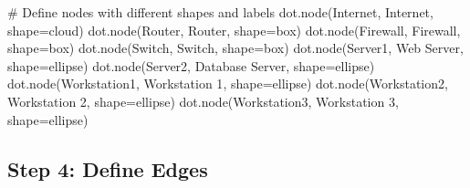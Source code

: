 \documentclass[
  letterpaper,
  DIV=11,
  numbers=noendperiod]{scrreprt}
\newenvironment{Shaded}{\begin{snugshade}}{\end{snugshade}}
\newcommand{\CommentTok}[1]{\textcolor[rgb]{0.37,0.37,0.37}{#1}}
\newcommand{\NormalTok}[1]{\textcolor[rgb]{0.00,0.23,0.31}{#1}}
\newcommand{\OperatorTok}[1]{\textcolor[rgb]{0.37,0.37,0.37}{#1}}
\newcommand{\StringTok}[1]{\textcolor[rgb]{0.13,0.47,0.30}{#1}}
\begin{document}
\begin{Shaded}
\begin{Highlighting}[]
\CommentTok{\# Define nodes with different shapes and labels}
\NormalTok{dot.node(}\StringTok{\textquotesingle{}Internet\textquotesingle{}}\NormalTok{, }\StringTok{\textquotesingle{}Internet\textquotesingle{}}\NormalTok{, shape}\OperatorTok{=}\StringTok{\textquotesingle{}cloud\textquotesingle{}}\NormalTok{)}
\NormalTok{dot.node(}\StringTok{\textquotesingle{}Router\textquotesingle{}}\NormalTok{, }\StringTok{\textquotesingle{}Router\textquotesingle{}}\NormalTok{, shape}\OperatorTok{=}\StringTok{\textquotesingle{}box\textquotesingle{}}\NormalTok{)}
\NormalTok{dot.node(}\StringTok{\textquotesingle{}Firewall\textquotesingle{}}\NormalTok{, }\StringTok{\textquotesingle{}Firewall\textquotesingle{}}\NormalTok{, shape}\OperatorTok{=}\StringTok{\textquotesingle{}box\textquotesingle{}}\NormalTok{)}
\NormalTok{dot.node(}\StringTok{\textquotesingle{}Switch\textquotesingle{}}\NormalTok{, }\StringTok{\textquotesingle{}Switch\textquotesingle{}}\NormalTok{, shape}\OperatorTok{=}\StringTok{\textquotesingle{}box\textquotesingle{}}\NormalTok{)}
\NormalTok{dot.node(}\StringTok{\textquotesingle{}Server1\textquotesingle{}}\NormalTok{, }\StringTok{\textquotesingle{}Web Server\textquotesingle{}}\NormalTok{, shape}\OperatorTok{=}\StringTok{\textquotesingle{}ellipse\textquotesingle{}}\NormalTok{)}
\NormalTok{dot.node(}\StringTok{\textquotesingle{}Server2\textquotesingle{}}\NormalTok{, }\StringTok{\textquotesingle{}Database Server\textquotesingle{}}\NormalTok{, shape}\OperatorTok{=}\StringTok{\textquotesingle{}ellipse\textquotesingle{}}\NormalTok{)}
\NormalTok{dot.node(}\StringTok{\textquotesingle{}Workstation1\textquotesingle{}}\NormalTok{, }\StringTok{\textquotesingle{}Workstation 1\textquotesingle{}}\NormalTok{, shape}\OperatorTok{=}\StringTok{\textquotesingle{}ellipse\textquotesingle{}}\NormalTok{)}
\NormalTok{dot.node(}\StringTok{\textquotesingle{}Workstation2\textquotesingle{}}\NormalTok{, }\StringTok{\textquotesingle{}Workstation 2\textquotesingle{}}\NormalTok{, shape}\OperatorTok{=}\StringTok{\textquotesingle{}ellipse\textquotesingle{}}\NormalTok{)}
\NormalTok{dot.node(}\StringTok{\textquotesingle{}Workstation3\textquotesingle{}}\NormalTok{, }\StringTok{\textquotesingle{}Workstation 3\textquotesingle{}}\NormalTok{, shape}\OperatorTok{=}\StringTok{\textquotesingle{}ellipse\textquotesingle{}}\NormalTok{)}
\end{Highlighting}
\end{Shaded}

\subsection{Step 4: Define Edges}\label{step-4-define-edges}
\end{document}
